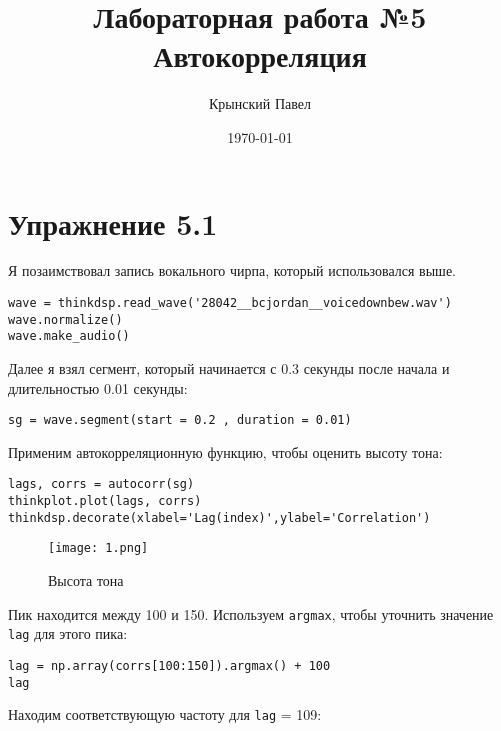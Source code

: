 \documentclass[a4paper,12pt]{report}
\title{Лабораторная работа №5\\Автокорреляция}
\author{Крынский Павел}
\date{\today}
\begin{document}
\maketitle
\tableofcontents
\listoffigures
\lstlistoflistings

\maketitle

\chapter{Упражнение 5.1}

Я позаимствовал запись вокального чирпа, который использовался выше.

\begin{lstlisting}[caption=Вокальный чирп]
wave = thinkdsp.read_wave('28042__bcjordan__voicedownbew.wav')
wave.normalize()
wave.make_audio()
\end{lstlisting}

Далее я взял сегмент, который начинается с 0.3 секунды после начала и длительностью 0.01 секунды:

\begin{lstlisting}[caption=Первый сегмент]
sg = wave.segment(start = 0.2 , duration = 0.01)
\end{lstlisting}

Применим автокорреляционную функцию, чтобы оценить высоту тона:

\begin{lstlisting}[caption=Оценка высоты тона]
lags, corrs = autocorr(sg)
thinkplot.plot(lags, corrs)
thinkdsp.decorate(xlabel='Lag(index)',ylabel='Correlation')
\end{lstlisting}

\begin{figure}[H]
        \centering
        \texttt{[image: 1.png]}
        \caption{Высота тона}
        \label{fig:lab5_fig1_1}
\end{figure}

Пик находится между 100 и 150. Используем \texttt{argmax}, чтобы уточнить значение \texttt{lag} для этого пика:

\begin{lstlisting}[caption=Нахождение \texttt{lag}]
lag = np.array(corrs[100:150]).argmax() + 100
lag
\end{lstlisting}

Находим соответствующую частоту для \texttt{lag} = 109:
\end{document}
